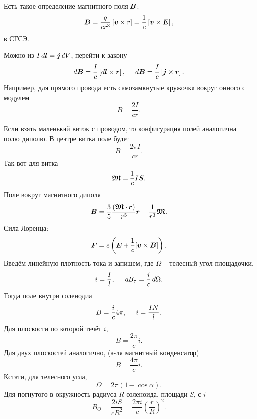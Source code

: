 Есть такое определение магнитного поля $\mbox{\boldmath $B$}$:
\begin{equation*}
    \mbox{\boldmath $B$} = \frac{q}{cr^3} \left[\mbox{\boldmath $v$} \times \mbox{\boldmath $r$}\right] = \frac{1}{c} \left[\mbox{\boldmath $v$} \times \mbox{\boldmath $E$} \right],
\end{equation*}
в СГСЭ.

Можно из $I \, d \mbox{\boldmath $l$} = \mbox{\boldmath $j$} \, d V$, перейти к закону 
\begin{equation*}
    d \mbox{\boldmath $B$} = \frac{I}{c} \left[d \mbox{\boldmath $l$} \times \mbox{\boldmath $r$} \right],
    \hspace{0.5cm} 
    d \mbox{\boldmath $B$} = \frac{I}{c} \left[ \mbox{\boldmath $j$} \times \mbox{\boldmath $r$} \right].
\end{equation*}
Например, для прямого провода есть самозамкнутые кружочки вокруг онного с модулем
\begin{equation*}
    B = \frac{2I}{cr}.
\end{equation*}

Если взять маленький виток с проводом, то конфигурация полей аналогична полю диполю. В центре витка поле будет
\begin{equation*}
    B =  \frac{2\pi I}{cr}.
\end{equation*}
Так вот для витка 
\begin{equation*}
    \mbox{\boldmath $\mathfrak{M}$} = \frac{1}{c} I \mbox{\boldmath $S$}.
\end{equation*}
Поле вокруг магнитного диполя
\begin{equation*}
    \mbox{\boldmath $B$} = \frac{3}{5} \frac{\left(\mbox{\boldmath $\mathfrak{M}$} \cdot \mbox{\boldmath $r$} \right)}{r^5} \mbox{\boldmath $r$} - \frac{1}{r^3} \mbox{\boldmath $\mathfrak{M}$}.
\end{equation*}
Сила Лоренца:
\begin{equation}
    \mbox{\boldmath $F$} = e \left(\mbox{\boldmath $E$} + \frac{1}{c} [\mbox{\boldmath $v$} \times \mbox{\boldmath $B$}]\right).
\end{equation}
Введём линейную плотность тока и запишем, где $\Omega$ -- телесный угол площадочки, 
\begin{equation*}
    i = \frac{I}{l},
    \hspace{0.5cm} 
    d B_{\tau} = \frac{i}{c} \, d \Omega.
\end{equation*}
Тогда поле внутри соленодиа
\begin{equation*}
    B = \frac{i}{c} 4 \pi, \hspace{0.5cm} i = \frac{IN}{l}.
\end{equation*}
Для плоскости по которой течёт $i$, 
\begin{equation*}
    B = \frac{2\pi}{c} i.
\end{equation*}
Для двух плоскостей аналогично, (а-ля магнитный конденсатор)
\begin{equation*}
    B = \frac{4\pi}{c} i.
\end{equation*}
Кстати, для телесного угла,
\begin{equation*}
    \Omega = 2 \pi (1 - \cos \alpha).
\end{equation*}
Для погнутого в окружность радиуса $R$ соленоида, площади $S$, с $i$
\begin{equation*}
    B_O = \frac{2iS}{cR^2} = \frac{2\pi i}{c} \left(\frac{r}{R} \right)^2.
\end{equation*}

